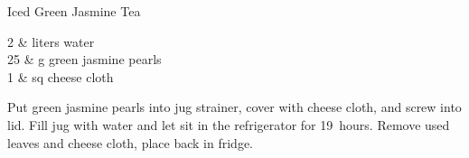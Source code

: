 \setHeadlines
{
}

\begin{recipe}
[ %
    source = Trial and error
]
{Iced Green Jasmine Tea}
    
    \ingredients
    {
		2 & liters water \\
		25 & g green jasmine pearls \\
		1 & sq cheese cloth \\
    }
    
    \preparation
    {
        \step Put green jasmine pearls into jug strainer, cover with cheese cloth, and screw into lid. 
		\step Fill jug with water and let sit in the refrigerator for 19~hours. 
		\step Remove used leaves and cheese cloth, place back in fridge. 
    }
	

\end{recipe}
